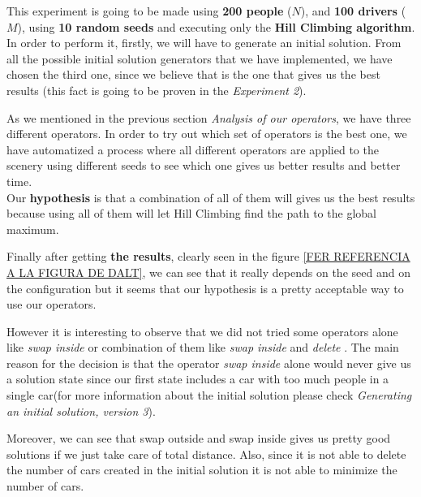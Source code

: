 \documentclass[12]{article}
\begin{document}
This experiment is going to be made using \textbf{200 people }($N$), and \textbf{100 drivers }($M$), using \textbf{10 random seeds} and executing only the \textbf{Hill Climbing algorithm}. In order to perform it, firstly, we will have to generate an initial solution. From all the possible initial solution generators that we have implemented, we have chosen the third one, since we believe that is the one that gives us the best results (this fact is going to be proven in the \textit{Experiment 2}). 

As we mentioned in the previous section \textit{Analysis of our operators}, we have three different operators. In order to try out which set of operators is the best one, we have automatized a process where all different operators are applied to the scenery using different seeds to see which one gives us better results and better time. 
\\
Our \textbf{hypothesis} is that a combination of all of them will gives us the best results because using all of them will let Hill Climbing find the path to the global maximum. 
%
\vspace{1cm}

Finally after getting \textbf{the results}, clearly seen in the figure \ref{FER REFERENCIA A LA FIGURA DE DALT}, we can see that it really depends on the seed and on the configuration but it seems that our hypothesis is a pretty acceptable way to use our operators.

However it is interesting to observe that we did not tried some operators alone like \textit{swap inside} or combination of them like \textit{swap inside} and \textit{delete} . The main reason for the decision is that the operator \textit{swap inside} alone would never give us a solution state since our first state includes a car with too much people in a single car(for more information about the initial solution please check \textit{Generating an initial solution, version 3}). 
\\
\smallskip

Moreover, we can see that swap outside and swap inside gives us pretty good solutions if we just take care of total distance. Also, since it is not able to delete the number of cars created in the initial solution it is not able to minimize the number of cars. 
\\
\smallskip
\end{document}
